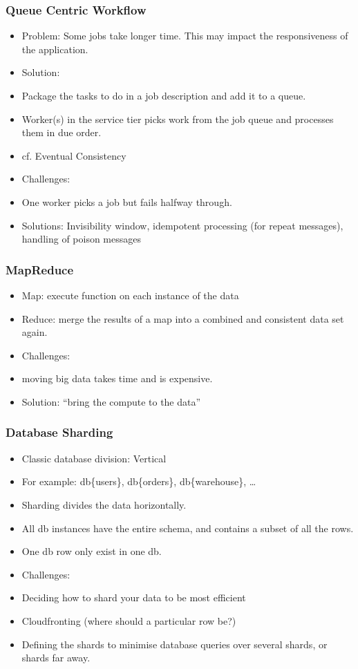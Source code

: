 \documentclass[10pt]{beamer}
\def\subitem{\item[\hspace{1.5cm} -]}
\begin{document}
\begin{frame}[t]
\frametitle{Queue Centric Workflow}
\begin{itemize}
\item Problem: Some jobs take longer time. This may impact the responsiveness of the application.
\item Solution:
\subitem Package the tasks to do in a job description and add it to a queue.
\subitem Worker(s) in the service tier picks work from the job queue and processes them in due order.
\subitem cf. Eventual Consistency
\item Challenges:
\subitem One worker picks a job but fails halfway through.
\subitem Solutions: Invisibility window, idempotent processing (for repeat messages), handling of poison messages
\end{itemize}
\end{frame}




\begin{frame}[t]
\frametitle{MapReduce}
\begin{itemize}
\item Map: execute function on each instance of the data
\item Reduce: merge the results of a map into a combined and consistent data set again.
\item Challenges:
\subitem moving big data takes time and is expensive.
\subitem Solution: ``bring the compute to the data''
\end{itemize}
\end{frame}

\begin{frame}[t]
\frametitle{Database Sharding}
\begin{itemize}
\item Classic database division: Vertical
\item For example: db\{users\}, db\{orders\}, db\{warehouse\}, \ldots
\item Sharding divides the data horizontally.
\item All db instances have the entire schema, and contains a subset of all the rows.
\item One db row only exist in one db.
\item Challenges:
\subitem Deciding how to shard your data to be most efficient
\subitem Cloudfronting (where should a particular row be?)
\subitem Defining the shards to minimise database queries over several shards, or shards far away.
\end{itemize}
\end{frame}
\end{document}
